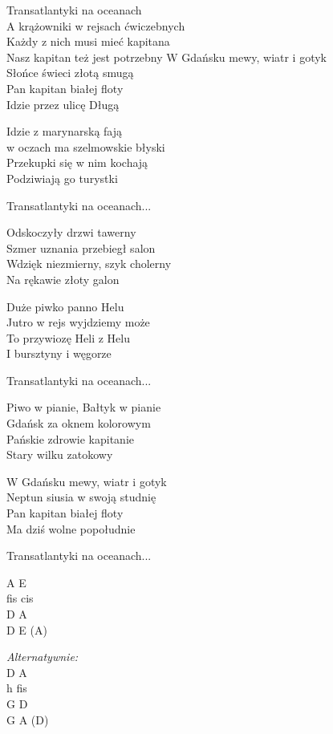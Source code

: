 \begin{text}
    \vin Transatlantyki na oceanach\\
    \vin A krążowniki w rejsach ćwiczebnych\\
    \vin Każdy z nich musi mieć kapitana\\
    \vin Nasz kapitan też jest potrzebny
\hfill\break
\hfill\break
\hfill\break
    W Gdańsku mewy, wiatr i gotyk\\
    Słońce świeci złotą smugą\\
    Pan kapitan białej floty\\
    Idzie przez ulicę Długą

    Idzie z marynarską fają\\
    w oczach ma szelmowskie błyski\\
    Przekupki się w nim kochają\\
    Podziwiają go turystki

    \vin Transatlantyki na oceanach...

    Odskoczyły drzwi tawerny\\
    Szmer uznania przebiegł salon\\
    Wdzięk niezmierny, szyk cholerny\\
    Na rękawie złoty galon

    Duże piwko panno Helu\\
    Jutro w rejs wyjdziemy może\\
    To przywiozę Heli z Helu\\
    I bursztyny i węgorze

    \vin Transatlantyki na oceanach...

    Piwo w pianie, Bałtyk w pianie\\
    Gdańsk za oknem kolorowym\\
    Pańskie zdrowie kapitanie\\
    Stary wilku zatokowy

    W Gdańsku mewy, wiatr i gotyk\\
    Neptun siusia w swoją studnię\\
    Pan kapitan białej floty\\
    Ma dziś wolne popołudnie

    \vin Transatlantyki na oceanach...

\end{text}
\begin{chord}
    A E\\
    fis cis\\
    D A\\
    D E (A)
	
	\textit{Alternatywnie:}\\
	D A\\
	h fis\\
	G D\\
	G A (D)
\end{chord}